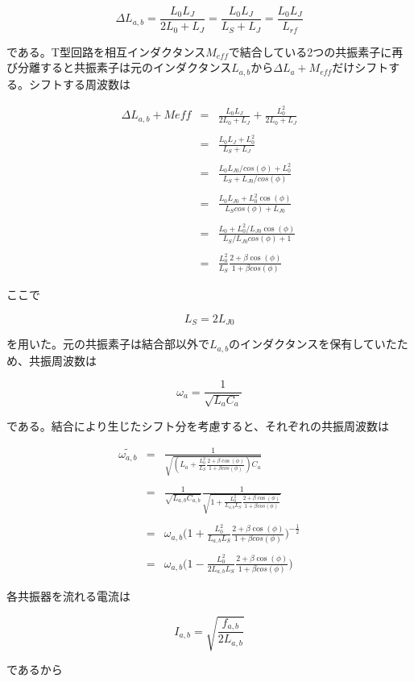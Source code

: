 \begin{equation}
    \Delta L_{a,b} = \frac{L_0L_J}{2L_0+L_J} = \frac{L_0L_J}{L_S+L_J} = \frac{L_0L_J}{L_{rf}}
\end{equation}

である。T型回路を相互インダクタンス$M_{eff}$で結合している2つの共振素子に再び分離すると共振素子は元のインダクタンス$L_{a,b}$から$\Delta L_a + M_{eff}$だけシフトする。シフトする周波数は

\begin{eqnarray}
    \Delta L_{a,b} + M{eff} & = &  \frac{L_0L_J}{2L_0+L_J} + \frac{L_0^2}{2L_0+L_J}\\ \\
    & = & \frac{L_0 L_J + L_0^2}{L_S + L_J}\\ \\
    & = & \frac{L_0 L_{J0}/cos(\phi) + L_0^2}{L_S + L_{J0}/cos(\phi)}\\ \\
    & = & \frac{L_0 L_{J0} + L_0^2 \cos(\phi)}{L_S cos(\phi) + L_{J0}}\\ \\
    & = & \frac{L_0 + L_0^2/L_{J0} \cos(\phi)}{L_S/L_{J0} cos(\phi) + 1}\\ \\
    & = & \frac{L_0^2}{L_S}\frac{2 + \beta \cos(\phi)}{1+\beta cos(\phi)}
\end{eqnarray}

ここで

\begin{equation}
    L_S = 2L_{J0}
\end{equation}

を用いた。元の共振素子は結合部以外で$L_{a,b}$のインダクタンスを保有していたため、共振周波数は

\begin{equation}
    \omega_a = \frac{1}{\sqrt{L_aC_a}}
\end{equation}

である。結合により生じたシフト分を考慮すると、それぞれの共振周波数は

\begin{eqnarray}
    \tilde{\omega_{a,b}} &=&  \frac{1}{\sqrt{(L_a+\frac{L_0^2}{L_S}\frac{2 + \beta \cos(\phi)}{1+\beta cos(\phi)})C_a}}\\ \\
    & = &  \frac{1}{\sqrt{L_{a,b}C_{a,b}}} \frac{1}{\sqrt{1+\frac{L_0^2}{L_{a,b}L_S}\frac{2 + \beta \cos(\phi)}{1+\beta cos(\phi)}}}\\ \\
    & = &  \omega_{a,b} \biggl(1+\frac{L_0^2}{L_{a,b}L_S}\frac{2 + \beta \cos(\phi)}{1+\beta cos(\phi)}\biggr)^{-\frac{1}{2}}\\ \\
    & = &  \omega_{a,b} \biggl(1-\frac{L_0^2}{2L_{a,b}L_S}\frac{2 + \beta \cos(\phi)}{1+\beta cos(\phi)}\biggr)
\end{eqnarray}

各共振器を流れる電流は

\begin{equation}
    I_{a,b} = \sqrt{\frac{f_{a,b}}{2 L_{a,b}}}
\end{equation}

であるから